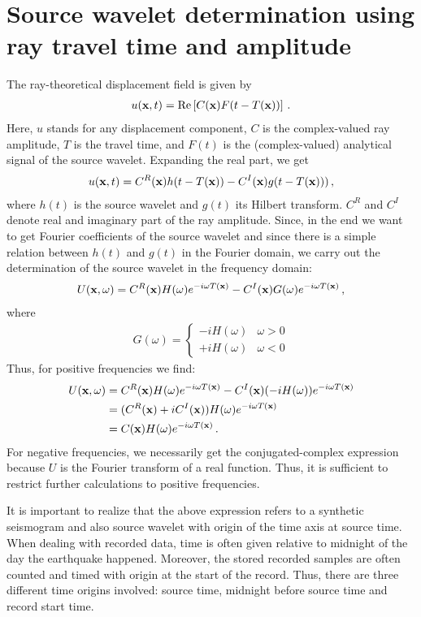 \section{Source wavelet determination using ray travel time and amplitude}
%
The ray-theoretical displacement field is given by
%
\begin{align}
   u(\textbf x,t) = \mathrm{Re}\left[C(\textbf x)F(t-T(\textbf x))\right] \,.
\end{align}
%
Here, $u$ stands for any displacement component, $C$ is the complex-valued ray amplitude, $T$ is the travel time, and $F(t)$ is the (complex-valued) analytical signal of the source wavelet. Expanding the real part, we get
%
\begin{align}
   u(\textbf x,t) = C^R(\textbf x)h(t-T(\textbf x))-C^I(\textbf x)g(t-T(\textbf x))) \,,
\end{align}
%
where $h(t)$ is the source wavelet and $g(t)$ its Hilbert transform. $C^R$ and $C^I$ denote real and imaginary part of the ray amplitude. Since, in the end we want to get Fourier coefficients of the source wavelet and since there is a simple relation between $h(t)$ and $g(t)$ in the Fourier domain, we carry out the determination of the source wavelet in the frequency domain:
%
\begin{align}
   U(\textbf x,\omega) = C^R(\textbf x) H(\omega)e^{-i\omega T(\textbf x)} -C^I(\textbf x) G(\omega)e^{-i\omega T(\textbf x)} \,,
\end{align}
%
where
%
\begin{align}
   G(\omega) = \left\{\begin{array}{cc} -iH(\omega) & \omega > 0 \\ +iH(\omega) & \omega < 0 \end{array}\right.
\end{align}
%
Thus, for positive frequencies we find:
%
\begin{align}
   U(\textbf x,\omega) & = C^R(\textbf x) H(\omega)e^{-i\omega T(\textbf x)} -C^I(\textbf x)(-iH(\omega))e^{-i\omega T(\textbf x)} \notag \\
                   & = (C^R(\textbf x)+iC^I(\textbf x))H(\omega)e^{-i\omega T(\textbf x)} \notag \\
                   & = C(\textbf x)H(\omega)e^{-i\omega T(\textbf x)} \,.
\end{align}
%
For negative frequencies, we necessarily get the conjugated-complex expression because $U$ is the Fourier transform of a real function. Thus, it is sufficient to restrict further calculations to positive frequencies.

It is important to realize that the above expression refers to a synthetic seismogram and also source wavelet with origin of the time axis at source time. When dealing with recorded data, time is often given relative to midnight of the day the earthquake happened. Moreover, the stored recorded samples are often counted and timed with origin at the start of the record. Thus, there are three different time origins involved: source time, midnight before source time and record start time.

